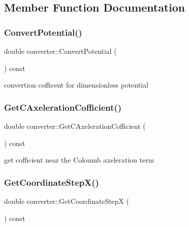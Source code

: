 \subsection{Member Function Documentation}
\mbox{\label{classconverter_a52660e55a0c282351a0a764787587f79}} 
\subsubsection{\texorpdfstring{Convert\+Potential()}{ConvertPotential()}}
{\footnotesize\ttfamily double converter\+::\+Convert\+Potential (\begin{DoxyParamCaption}{ }\end{DoxyParamCaption}) const}



convertion cofficent for dimensionless potential 

\mbox{\label{classconverter_a6701071c81bc345e3cfa096bebfeb291}} 
\subsubsection{\texorpdfstring{Get\+C\+Axeleration\+Cofficient()}{GetCAxelerationCofficient()}}
{\footnotesize\ttfamily double converter\+::\+Get\+C\+Axeleration\+Cofficient (\begin{DoxyParamCaption}{ }\end{DoxyParamCaption}) const}



get cofficient near the Coloumb axeleration term 

\mbox{\label{classconverter_a3b867cd7429ebf9227a2c9442bb25124}} 
\subsubsection{\texorpdfstring{Get\+Coordinate\+Step\+X()}{GetCoordinateStepX()}}
{\footnotesize\ttfamily double converter\+::\+Get\+Coordinate\+StepX (\begin{DoxyParamCaption}{ }\end{DoxyParamCaption}) const}



